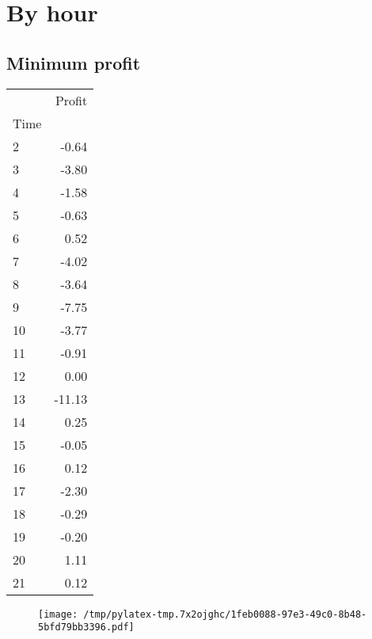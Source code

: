 \documentclass{article}%
\begin{document}
%
\newpage %
\section{By hour}%
\label{sec:Byhour}%
\subsection{Minimum profit }%
\label{subsec:Minimumprofit}%
\begin{tabular}{lr}
\toprule
{} &  Profit \\
Time &         \\
\midrule
2    &   -0.64 \\
3    &   -3.80 \\
4    &   -1.58 \\
5    &   -0.63 \\
6    &    0.52 \\
7    &   -4.02 \\
8    &   -3.64 \\
9    &   -7.75 \\
10   &   -3.77 \\
11   &   -0.91 \\
12   &    0.00 \\
13   &  -11.13 \\
14   &    0.25 \\
15   &   -0.05 \\
16   &    0.12 \\
17   &   -2.30 \\
18   &   -0.29 \\
19   &   -0.20 \\
20   &    1.11 \\
21   &    0.12 \\
\bottomrule
\end{tabular}
%


\begin{figure}[htbp]%
\centering%
\texttt{[image: /tmp/pylatex-tmp.7x2ojghc/1feb0088-97e3-49c0-8b48-5bfd79bb3396.pdf]}%
\end{figure}

%
\newpage %
\end{document}
